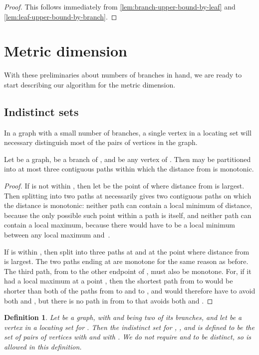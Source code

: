 \documentclass{jgaa-art}
\newtheorem{definition}{Definition}
\begin{document}
\begin{proof}
This follows immediately from \autoref{lem:branch-upper-bound-by-leaf} and \autoref{lem:leaf-upper-bound-by-branch}.
\end{proof}

\section{Metric dimension}

With these preliminaries about numbers of branches in hand, we are ready to start describing our algorithm for the metric dimension.

\subsection{Indistinct sets}

In a graph with a small number of branches, a single vertex in a locating set will necessary distinguish most of the pairs of vertices in the graph.

\begin{lemma}
\label{lem:monotonic}
Let  be a graph,  be a branch of , and  be any vertex of . Then  may be partitioned into at most three contiguous paths within which the distance from  is monotonic.
\end{lemma}

\begin{proof}
If  is not within , then let  be the point of  where distance from  is largest. Then splitting  into two paths at  necessarily gives two contiguous paths on which the distance is monotonic: neither path can contain a local minimum of distance, because the only possible such point within a path is  itself, and neither path can contain a local maximum, because there would have to be a local minimum between any local maximum and~.

If  is within , then split  into three paths at  and at the point  where distance from  is largest. The two paths ending at  are monotone for the same reason as before. The third path, from  to the other endpoint  of , must also be monotone. For, if it had a local maximum at a point , then the shortest path from  to  would be shorter than both of the paths from  to  and  to , and would therefore have to avoid both  and , but there is no path in  from  to  that avoids both  and .
\end{proof}

\begin{definition}
Let  be a graph, with  and  being two of its branches, and let  be a vertex in a locating set for .
Then the \emph{indistinct set} for , , and  is defined to be the set of pairs  of vertices  with  and  with . We do not require  and  to be distinct, so  is allowed in this definition.
\end{definition}
\end{document}
